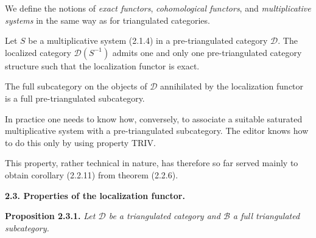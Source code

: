 We define the notions of \emph{exact functors},
\emph{cohomological functors}, and \emph{multiplicative systems} in the
same way as for triangulated categories.

Let $S$ be a multiplicative system (2.1.4) in a pre-triangulated category
$\mathcal D$. The localized category $\mathcal D(S^{-1})$ admits one and
only one pre-triangulated category structure such that the localization
functor is exact.

The full subcategory on the objects of $\mathcal D$ annihilated by the
localization functor is a full pre-triangulated subcategory.

In practice one needs to know how, conversely, to associate a suitable
saturated multiplicative system with a pre-triangulated subcategory. The
editor knows how to do this only by using property TRIV.

This property, rather technical in nature, has therefore so far served
mainly to obtain corollary (2.2.11) from theorem (2.2.6).

\medskip
\noindent\textbf{2.3. Properties of the localization functor.}

\smallskip
\noindent\textbf{Proposition 2.3.1.}\quad
\itshape Let $\mathcal D$ be a triangulated category and
$\mathcal B$ a full triangulated subcategory.\upshape

\endgroup

